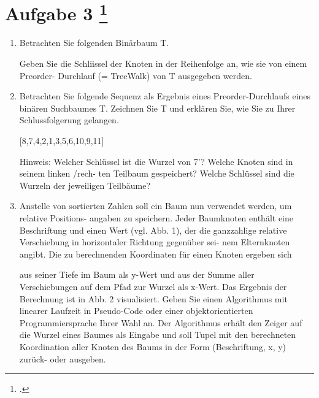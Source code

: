 \documentclass{lehramt-informatik-aufgabe}
\begin{document}
\section{Aufgabe 3
\footcite{66115:2021:03}}

\begin{enumerate}
\item Betrachten Sie folgenden Binärbaum T.

Geben Sie die Schliissel der Knoten in der Reihenfolge an, wie sie von
einem Preorder- Durchlauf (= TreeWalk) von T ausgegeben werden.

\item Betrachten Sie folgende Sequenz als Ergebnis eines
Preorder-Durchlaufs eines binären Suchbaumes T. Zeichnen Sie T und
erklären Sie, wie Sie zu Ihrer Schlussfolgerung gelangen.

[8,7,4,2,1,3,5,6,10,9,11]

Hinweis: Welcher Schlüssel ist die Wurzel von 7’? Welche Knoten sind in
seinem linken /rech- ten Teilbaum gespeichert? Welche Schlüssel sind die
Wurzeln der jeweiligen Teilbäume?

\newpage

\item Anstelle von sortierten Zahlen soll ein Baum nun verwendet werden,
um relative Positions- angaben zu speichern. Jeder Baumknoten enthält
eine Beschriftung und einen Wert (vgl. Abb. 1), der die ganzzahlige
relative Verschiebung in horizontaler Richtung gegenüber sei- nem
Elternknoten angibt. Die zu berechnenden Koordinaten für einen Knoten
ergeben sich

aus seiner Tiefe im Baum als y-Wert und aus der Summe aller
Verschiebungen auf dem Pfad zur Wurzel als x-Wert. Das Ergebnis der
Berechnung ist in Abb. 2 visualisiert. Geben Sie einen Algorithmus mit
linearer Laufzeit in Pseudo-Code oder einer objektorientierten
Programmiersprache Ihrer Wahl an. Der Algorithmus erhält den Zeiger auf
die Wurzel eines Baumes als Eingabe und soll Tupel mit den berechneten
Koordination aller Knoten des Baums in der Form (Beschriftung, x, y)
zurück- oder ausgeben.


\end{enumerate}
\end{document}
